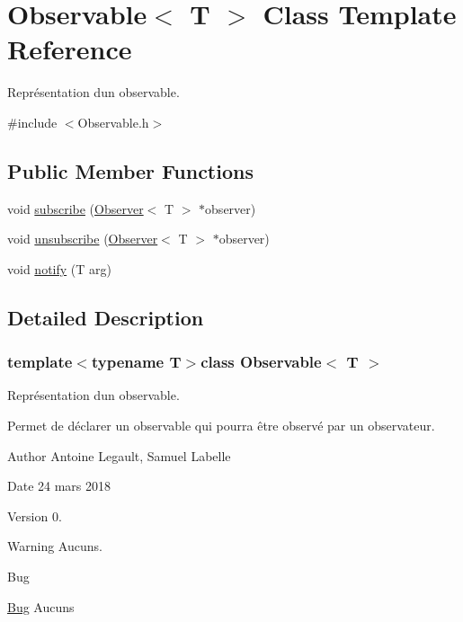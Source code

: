 \hypertarget{class_observable}{}\section{Observable$<$ T $>$ Class Template Reference}
\label{class_observable}


Représentation d\textquotesingle{}un observable.  




{\ttfamily \#include $<$Observable.\+h$>$}

\subsection*{Public Member Functions}
\begin{DoxyCompactItemize}
\item 
void \hyperlink{class_observable_ac5e570ced9c4a4d463da7bbd97fadec3}{subscribe} (\hyperlink{class_observer}{Observer}$<$ T $>$ $\ast$observer)
\item 
void \hyperlink{class_observable_a21dddc68afb209a3ed24761dec754bd6}{unsubscribe} (\hyperlink{class_observer}{Observer}$<$ T $>$ $\ast$observer)
\item 
void \hyperlink{class_observable_abc76f593ffea27f552833dafcd78bc5a}{notify} (T arg)
\end{DoxyCompactItemize}


\subsection{Detailed Description}
\subsubsection*{template$<$typename T$>$class Observable$<$ T $>$}

Représentation d\textquotesingle{}un observable. 

Permet de déclarer un observable qui pourra être observé par un observateur. \begin{DoxyAuthor}{Author}
Antoine Legault, Samuel Labelle 
\end{DoxyAuthor}
\begin{DoxyDate}{Date}
24 mars 2018 
\end{DoxyDate}
\begin{DoxyVersion}{Version}
0. 
\end{DoxyVersion}
\begin{DoxyWarning}{Warning}
Aucuns. 
\end{DoxyWarning}
\begin{DoxyRefDesc}{Bug}
\item[\hyperlink{bug__bug000010}{Bug}]Aucuns \end{DoxyRefDesc}



